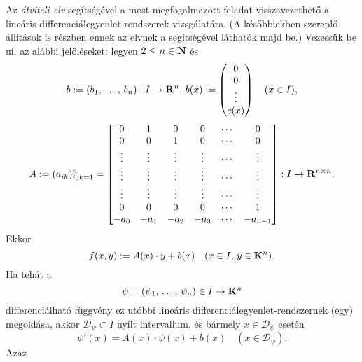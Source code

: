 Az \textit{átviteli elv} segítségével a most megfogalmazott feladat visszavezethető a lineáris differenciálegyenlet-rendszerek vizsgálatára. (A későbbiekben szereplő állítások is részben ennek az elvnek a segítségével láthatók majd be.) Vezessük be ui. az alábbi jelöléseket: legyen $2 \leq n \in \mathbf{N}$ és
\[
	b := (b_1, \, \dots, \, b_n) : I \to \mathbf{R}^n, \, b(x) := \begin{pmatrix}
		0 \\
		0 \\
		\vdots \\
		c(x)
	\end{pmatrix} \quad (x \in I),
\]
\[
	A := (a_{ik})_{i, \, k = 1}^n = \begin{bmatrix}
		0 & 1 & 0 & 0 & \cdots & 0 \\
		0 & 0 & 1 & 0 & \cdots & 0 \\
		\vdots & \vdots & \vdots & \vdots & \cdots & \vdots \\
		\vdots & \vdots & \vdots & \vdots & \cdots & \vdots \\
		\vdots & \vdots & \vdots & \vdots & \cdots & \vdots \\
		0 & 0 & 0 & 0 & \cdots & 1 \\
		-a_0 & -a_1 & -a_2 & -a_3 & \cdots & -a_{n-1}
	\end{bmatrix} : I \to \mathbf{R}^{n \times n}.
\]
Ekkor
\[
	f(x, y) := A(x) \cdot y + b(x) \quad (x \in I, \, y \in \mathbf{K}^n).
\]
Ha tehát a
\[
	\psi = (\psi_1, \, \dots, \, \psi_n) \in I \to \mathbf{K}^n
\]
differenciálható függvény ez utóbbi lineáris differenciálegyenlet-rendszernek (egy) megoldása, akkor $\mathcal{D}_\psi \subset I$ nyílt intervallum, és bármely $x \in \mathcal{D}_\psi$ esetén
\[
	\psi'(x) = A(x) \cdot \psi(x) + b(x) \quad (x \in \mathcal{D}_\psi).
\]
Azaz
